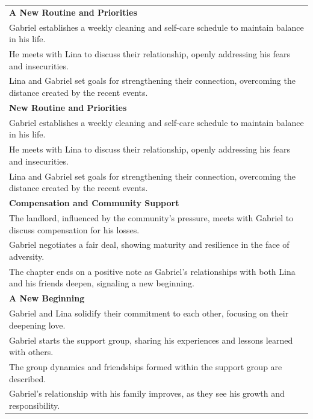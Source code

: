 \begin{small}
\begin{longtable}{p{}}
\textbf{A New Routine and Priorities}\\
Gabriel establishes a weekly cleaning and self-care schedule to maintain balance in his life.\\
He meets with Lina to discuss their relationship, openly addressing his fears and insecurities.\\
Lina and Gabriel set goals for strengthening their connection, overcoming the distance created by the recent events.\\


\textbf{New Routine and Priorities}\\

Gabriel establishes a weekly cleaning and self-care schedule to maintain balance in his life.\\

He meets with Lina to discuss their relationship, openly addressing his fears and insecurities.\\

Lina and Gabriel set goals for strengthening their connection, overcoming the distance created by the recent events.\\
    




\textbf{Compensation and Community Support}\\

The landlord, influenced by the community's pressure, meets with Gabriel to discuss compensation for his losses.\\

Gabriel negotiates a fair deal, showing maturity and resilience in the face of adversity.\\

The chapter ends on a positive note as Gabriel's relationships with both Lina and his friends deepen, signaling a new beginning.\\
                    



\textbf{A New Beginning}\\
Gabriel and Lina solidify their commitment to each other, focusing on their deepening love.\\
Gabriel starts the support group, sharing his experiences and lessons learned with others.\\
The group dynamics and friendships formed within the support group are described.\\
Gabriel's relationship with his family improves, as they see his growth and responsibility.\\






\end{longtable}
\end{small}
